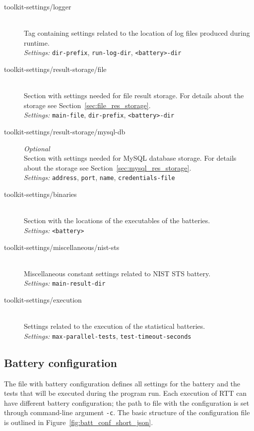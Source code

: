 \documentclass[
	digital,    %
	oneside,
	color,
	11pt,
	nocover,
	notable,
	nolof,
	nolot,
]{fithesis3}
\theoremstyle{definition}
\theoremstyle{remark}
\begin{document}
\begin{description}
\item[toolkit-settings/logger] \hfill \\
Tag containing settings related to the location of log files produced during runtime. \\
\textit{Settings: } \texttt{dir-prefix}, \texttt{run-log-dir}, \texttt{<battery>-dir}

\item[toolkit-settings/result-storage/file] \hfill \\
Section with settings needed for file result storage. For details about the storage see Section~\ref{sec:file_res_storage}. \\
\textit{Settings: } \texttt{main-file}, \texttt{dir-prefix}, \texttt{<battery>-dir}

\item[toolkit-settings/result-storage/mysql-db] \textit{Optional} \hfill \\
Section with settings needed for MySQL database storage. For details about the storage see Section~\ref{sec:mysql_res_storage}. \\
\textit{Settings: } \texttt{address}, \texttt{port}, \texttt{name}, \texttt{credentials-file}

\item[toolkit-settings/binaries] \hfill \\
Section with the locations of the executables of the batteries. \\
\textit{Settings: } \texttt{<battery>}

\item[toolkit-settings/miscellaneous/nist-sts] \hfill \\
Miscellaneous constant settings related to NIST STS battery. \\
\textit{Settings: } \texttt{main-result-dir}

\item[toolkit-settings/execution] \hfill \\
Settings related to the execution of the statistical batteries. \\
\textit{Settings: } \texttt{max-parallel-tests}, \texttt{test-timeout-seconds}

\end{description}

\subsection{Battery configuration}
\label{sec:batt_conf}
The file with battery configuration defines all settings for the battery and the tests that will be executed during the program run. Each execution of RTT can have different battery configuration; the path to file with the configuration is set through command-line argument \texttt{-c}. The basic structure of the configuration file is outlined in Figure~\ref{fig:batt_conf_short_json}. 
\end{document}
